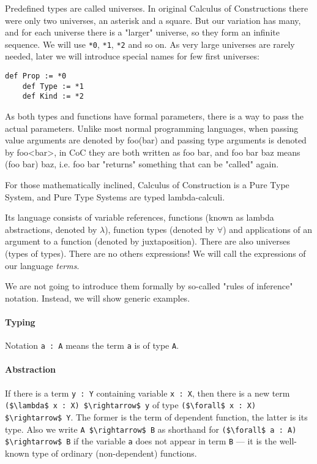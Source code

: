 \documentclass[11pt,oneside]{article}
\begin{document}
Predefined types are called universes. In original Calculus of Constructions
there were only two universes, an asterisk and a square. But our variation has
many, and for each universe there is a "larger" universe, so they form an infinite sequence. We will use \lstinline|*0|, \lstinline|*1|, \lstinline|*2| and so on.
As very large universes are rarely needed, later we will introduce special names for few first universes:

\begin{lstlisting}[mathescape=true]
    def Prop := *0
    def Type := *1
    def Kind := *2
\end{lstlisting}

As both types and functions have formal parameters, there is a way to pass the actual parameters. Unlike most normal programming languages, when passing value arguments are denoted by foo(bar) and passing type arguments is denoted by foo<bar>, in
CoC they are both written as foo bar, and foo bar baz means (foo bar) baz, i.e. foo bar "returns" something that can be "called" again.

For those mathematically inclined, Calculus of Construction is a Pure Type System, and Pure Type Systems are typed lambda-calculi.

Its language consists of variable references,
functions (known as lambda abstractions,
denoted by $\lambda$),
function types (denoted by $\forall$)
and applications of an argument to a function
(denoted by juxtaposition).
There are also universes (types of types).
There are no others expressions!
We will call the expressions of our language  {\em terms}.

We are not going to introduce them formally by so-called
"rules of inference" notation. Instead, we will show generic examples.

\paragraph{Typing}
Notation \lstinline|a : A| means the term \lstinline|a| is of type \lstinline|A|.

\paragraph{Abstraction}
If there is a term \lstinline[mathescape=true]|y : Y| containing variable \lstinline|x : X|,
then there is a new term
\lstinline[mathescape=true]|($\lambda$ x : X) $\rightarrow$ y|
of type
\lstinline[mathescape=true]|($\forall$ x : X) $\rightarrow$ Y|.
The former is the term of dependent function, the latter is its type.
Also we write \lstinline[mathescape=true]|A $\rightarrow$ B| as shorthand for
\lstinline[mathescape=true]|($\forall$ a : A) $\rightarrow$ B| if the variable \lstinline|a|
does not appear in term \lstinline[mathescape=true]|B| ---
it is the well-known type of ordinary (non-dependent) functions.
\end{document}
